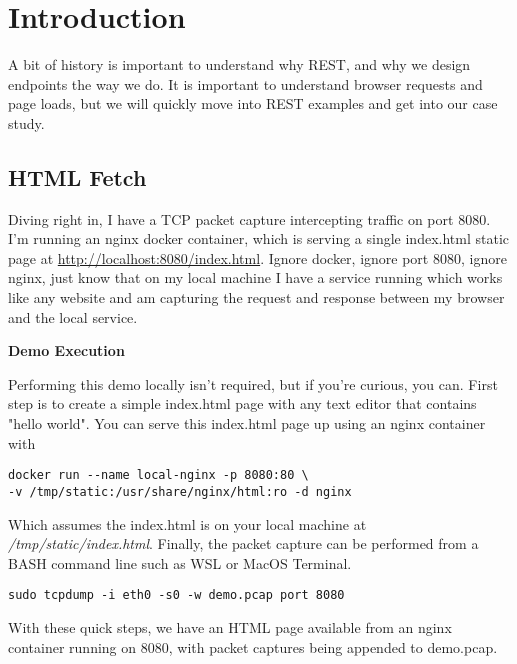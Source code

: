 \chapter{Introduction}

A bit of history is important to understand why REST, and why we design endpoints the way we do.  It is important to understand browser requests and page loads, but we will quickly move into REST examples and get into our case study.

\section{HTML Fetch}

Diving right in, I have a TCP packet capture intercepting traffic on port 8080.  I'm running an nginx docker container, which is serving a single index.html static page at \url{http://localhost:8080/index.html}. Ignore docker, ignore port 8080, ignore nginx, just know that on my local machine I have a service running which works like any website and am capturing the request and response between my browser and the local service.

\begin{sidebar}
\begin{minipage}{\linewidth}
\begin{center}
\textbf{Demo Execution}
\end{center}
Performing this demo locally isn't required, but if you're curious, you can.  First step is to create a simple index.html page with any text editor that contains "hello world".  You can serve this index.html page up using an nginx container with
\begin{code}
\begin{lstlisting}[belowskip=-\baselineskip]
docker run --name local-nginx -p 8080:80 \
-v /tmp/static:/usr/share/nginx/html:ro -d nginx
\end{lstlisting}
\end{code}
Which assumes the index.html is on your local machine at \textit{/tmp/static/index.html}. Finally, the packet capture can be performed from a BASH command line such as WSL or MacOS Terminal.
\begin{code}
\begin{lstlisting}[belowskip=-\baselineskip]
sudo tcpdump -i eth0 -s0 -w demo.pcap port 8080
\end{lstlisting}
\end{code}
With these quick steps, we have an HTML page available from an nginx container running on 8080, with packet captures being appended to demo.pcap.
\end{minipage}
\end{sidebar}

